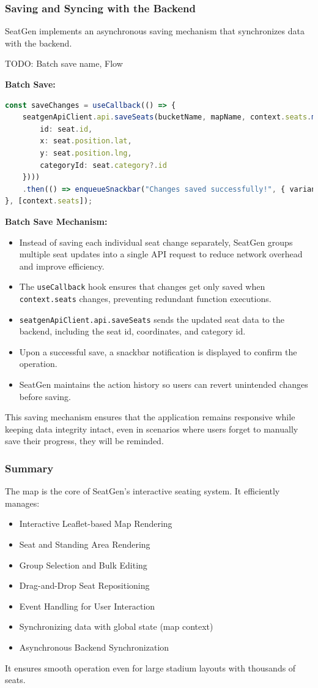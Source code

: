 \subsubsection{Saving and Syncing with the Backend}
SeatGen implements an asynchronous saving mechanism that synchronizes data with the backend.

TODO: Batch save name, Flow

\textbf{Batch Save:}
\begin{lstlisting}[language=TypeScript, caption=Batch Save Mechanism, label=lst:batch-save-seats]
const saveChanges = useCallback(() => {
    seatgenApiClient.api.saveSeats(bucketName, mapName, context.seats.map(seat => ({
        id: seat.id,
        x: seat.position.lat,
        y: seat.position.lng,
        categoryId: seat.category?.id
    })))
    .then(() => enqueueSnackbar("Changes saved successfully!", { variant: "success" }));
}, [context.seats]);
\end{lstlisting}

\textbf{Batch Save Mechanism:}
\begin{itemize}
    \item Instead of saving each individual seat change separately, SeatGen groups multiple seat updates into a single API request to reduce network overhead and improve efficiency.
    \item The \texttt{useCallback} hook ensures that changes get only saved when \texttt{context.seats} changes, preventing redundant function executions.
    \item \texttt{seatgenApiClient.api.saveSeats} sends the updated seat data to the backend, including the seat id, coordinates, and category id.
    \item Upon a successful save, a snackbar notification is displayed to confirm the operation.
    \item SeatGen maintains the action history so users can revert unintended changes before saving.
\end{itemize}

This saving mechanism ensures that the application remains responsive while keeping data integrity intact, even in scenarios where users forget to manually save their progress, they will be reminded.

\subsubsection{Summary}
The map is the core of SeatGen’s interactive seating system. It efficiently manages:
\begin{itemize}
    \item Interactive Leaflet-based Map Rendering
    \item Seat and Standing Area Rendering
    \item Group Selection and Bulk Editing
    \item Drag-and-Drop Seat Repositioning
    \item Event Handling for User Interaction
    \item Synchronizing data with global state (map context)
    \item Asynchronous Backend Synchronization
\end{itemize}

It ensures smooth operation even for large stadium layouts with thousands of seats.


